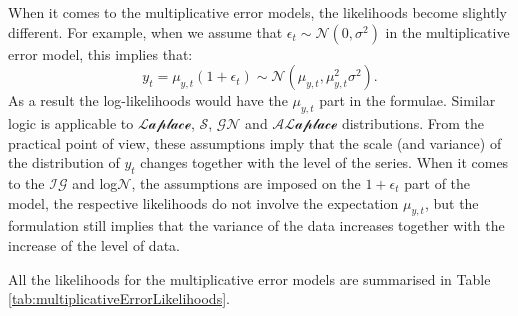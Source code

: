 \documentclass[
]{book}
\theoremstyle{definition}
\theoremstyle{definition}
\theoremstyle{definition}
\theoremstyle{definition}
\theoremstyle{remark}
\begin{document}
When it comes to the multiplicative error models, the likelihoods become slightly different. For example, when we assume that \(\epsilon_t \sim \mathcal{N}(0, \sigma^2)\) in the multiplicative error model, this implies that:
\begin{equation}
    y_t = \mu_{y,t}(1+\epsilon_t) \sim \mathcal{N}(\mu_{y,t}, \mu_{y,t}^2 \sigma^2) .
  \label{eq:ETSADAMNormalDistributionExample03}
\end{equation}
As a result the log-likelihoods would have the \(\mu_{y,t}\) part in the formulae. Similar logic is applicable to \(\mathcal{Laplace}\), \(\mathcal{S}\), \(\mathcal{GN}\) and \(\mathcal{ALaplace}\) distributions. From the practical point of view, these assumptions imply that the scale (and variance) of the distribution of \(y_t\) changes together with the level of the series. When it comes to the \(\mathcal{IG}\) and log\(\mathcal{N}\), the assumptions are imposed on the \(1+\epsilon_t\) part of the model, the respective likelihoods do not involve the expectation \(\mu_{y,t}\), but the formulation still implies that the variance of the data increases together with the increase of the level of data.

All the likelihoods for the multiplicative error models are summarised in Table \ref{tab:multiplicativeErrorLikelihoods}.
\end{document}
